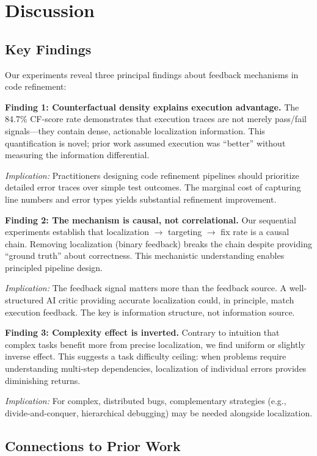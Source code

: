 \section{Discussion}
\label{sec:discussion}

\subsection{Key Findings}

Our experiments reveal three principal findings about feedback mechanisms in code refinement:

\textbf{Finding 1: Counterfactual density explains execution advantage.} The 84.7\% CF-score rate demonstrates that execution traces are not merely pass/fail signals---they contain dense, actionable localization information. This quantification is novel; prior work assumed execution was ``better'' without measuring the information differential.

\emph{Implication:} Practitioners designing code refinement pipelines should prioritize detailed error traces over simple test outcomes. The marginal cost of capturing line numbers and error types yields substantial refinement improvement.

\textbf{Finding 2: The mechanism is causal, not correlational.} Our sequential experiments establish that localization $\rightarrow$ targeting $\rightarrow$ fix rate is a causal chain. Removing localization (binary feedback) breaks the chain despite providing ``ground truth'' about correctness. This mechanistic understanding enables principled pipeline design.

\emph{Implication:} The feedback signal matters more than the feedback source. A well-structured AI critic providing accurate localization could, in principle, match execution feedback. The key is information structure, not information source.

\textbf{Finding 3: Complexity effect is inverted.} Contrary to intuition that complex tasks benefit more from precise localization, we find uniform or slightly inverse effect. This suggests a task difficulty ceiling: when problems require understanding multi-step dependencies, localization of individual errors provides diminishing returns.

\emph{Implication:} For complex, distributed bugs, complementary strategies (e.g., divide-and-conquer, hierarchical debugging) may be needed alongside localization.

\subsection{Connections to Prior Work}

